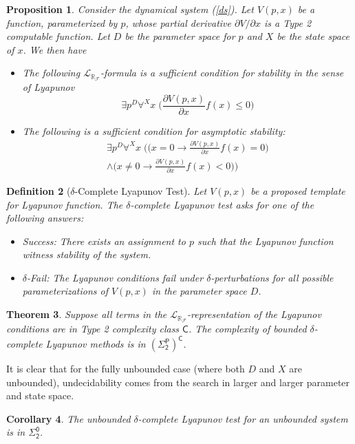 \documentclass[10pt]{article}
\theoremstyle{plain}
\newtheorem{theorem}{Theorem}[section]
\newtheorem{proposition}[theorem]{Proposition}
\newtheorem{corollary}[theorem]{Corollary}
\newtheorem{definition}[theorem]{Definition}
\theoremstyle{definition}
\newcommand{\lrf}{\mathcal{L}_{\mathbb{R}_{\mathcal{F}}}}
\begin{document}
\begin{proposition} Consider the dynamical system (\ref{ds}). Let $V(p,x)$ be a function, parameterized by $p$, whose partial derivative ${\partial V}/{\partial x}$ is a Type 2 computable function. Let $D$ be the parameter space for $p$ and $X$ be the state space of $x$. We then have
\begin{itemize}
\item The following $\lrf$-formula is a sufficient condition for stability in the sense of Lyapunov
$$\exists p^D\forall^X x\; \bigg(\frac{\partial V(p,x)}{\partial x}f(x)\leq 0\bigg)$$
\item The following is a sufficient condition for asymptotic stability:
\begin{multline*}
\exists p^D\forall^X x\;\bigg(\Big(x=0\rightarrow\frac{\partial V(p,x)}{\partial x}f(x)= 0\bigg)\\
\wedge \bigg(x\neq 0 \rightarrow \frac{\partial V(p,x)}{\partial x}f(x)< 0\Big)\bigg)
\end{multline*}
\end{itemize}
\end{proposition}

\begin{definition}[$\delta$-Complete Lyapunov Test]
Let $V(p,x)$ be a proposed template for Lyapunov function. The $\delta$-complete Lyapunov test asks for one of the following answers:
\begin{itemize}
\item {\sf Success}: There exists an assignment to $p$ such that the Lyapunov function witness stability of the system. 
\item {\sf $\delta$-Fail}: The Lyapunov conditions fail under $\delta$-perturbations for all possible parameterizations of $V(p,x)$ in the parameter space $D$.
\end{itemize}
\end{definition}
\begin{theorem}
Suppose all terms in the $\lrf$-representation of the Lyapunov conditions are in Type 2 complexity class $\mathsf{C}$. The complexity of bounded $\delta$-complete Lyapunov methods is in $\mathsf{(\Sigma^P_2)^C}$. 
\end{theorem}

It is clear that for the fully unbounded case (where both $D$ and $X$ are unbounded), undecidability comes from the search in larger and larger parameter and state space. 
\begin{corollary}
The unbounded $\delta$-complete Lyapunov test for an unbounded system is in $\mathsf{\Sigma_2^0}$. 
\end{corollary}
\end{document}
